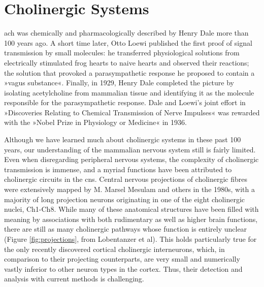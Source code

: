 
\section{Cholinergic Systems}
 \Ac{ach} was chemically and pharmacologically described by Henry Dale more than 100 years ago\cite{Dale1914}. A short time later, Otto Loewi published the first proof of signal transmission by small molecules: he transferred physiological solutions from electrically stimulated frog hearts to naive hearts and observed their reactions; the solution that provoked a parasympathetic response he proposed to contain a »vagus substance«\cite{Loewi1921}. Finally, in 1929, Henry Dale completed the picture by isolating acetylcholine from mammalian tissue and identifying it as the molecule responsible for the parasympathetic response\cite{Dale1929}. Dale and Loewi's joint effort in »Discoveries Relating to Chemical Transmission of Nerve Impulses« was rewarded with the »Nobel Prize in Physiology or Medicine« in 1936.

Although we have learned much about cholinergic systems in these past 100 years, our understanding of the mammalian nervous system still is fairly limited. Even when disregarding peripheral nervous systems, the complexity of cholinergic transmission is immense, and a myriad functions have been attributed to cholinergic circuits in the \ac{cns}. Central nervous projections of cholinergic fibres were extensively mapped by M. Marsel Mesulam and others in the 1980s\cite{Mesulam1984}, with a majority of long projection neurons originating in one of the eight cholinergic nuclei, Ch1-Ch8. While many of these anatomical structures have been filled with meaning by associations with both rudimentary as well as higher brain functions, there are still as many cholinergic pathways whose function is entirely unclear (Figure \ref{fig:projections}, from Lobentanzer et al\cite{Lobentanzer2019a}). This holds particularly true for the only recently discovered cortical cholinergic interneurons, which, in comparison to their projecting counterparts, are very small and numerically vastly inferior to other neuron types in the cortex. Thus, their detection and analysis with current methods is challenging. 

